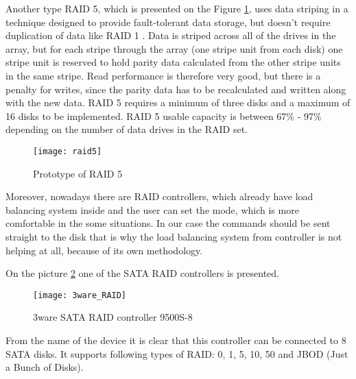 Another type RAID 5, which is presented on the Figure \ref{fig:raid5}, uses data striping in a technique designed to provide fault-tolerant data storage, but doesn't require duplication of data like RAID 1 \cite{raid_overview}. Data is striped across all of the drives in the array, but for each stripe through the array (one stripe unit from each disk) one stripe unit is reserved to hold parity data calculated from the other stripe units in the same stripe. Read performance is therefore very good, but there is a penalty for writes, since the parity data has to be recalculated and written along with the new data. RAID 5 requires a minimum of three disks and a maximum of 16 disks to be implemented. RAID 5 usable capacity is between 67\% - 97\% depending on the number of data drives in the RAID set.
\begin{figure}[h]
\begin{center}
  \texttt{[image: raid5]}
\end{center}
  \caption{Prototype of RAID 5}
  \label{fig:raid5}
\end{figure}
Moreover, nowadays there are RAID controllers, which already have load balancing system inside and the user can set the mode, which is more comfortable in the some situations. In our case the commands should be sent straight to the disk that is why the load balancing system from controller is not helping at all, because of its own methodology.  

On the picture \ref{fig:3ware_RAID} one of the SATA RAID controllers is presented. 
\begin{figure}[h]
\begin{center}
  \texttt{[image: 3ware\_RAID]}
\end{center}
  \caption{3ware SATA RAID controller 9500S-8}
  \label{fig:3ware_RAID}
\end{figure}
From the name of the device it is clear that this controller can be connected to 8 SATA disks. It supports following types of RAID: 0, 1, 5, 10, 50 and JBOD (Just a Bunch of Disks).

\newpage
